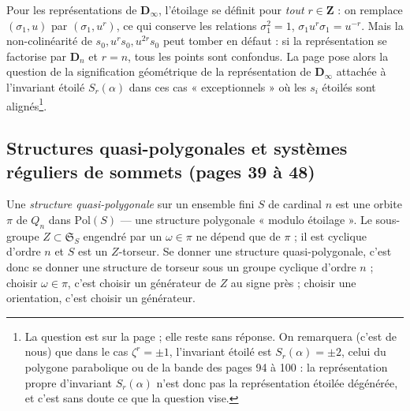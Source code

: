 \documentclass[11pt,a4paper]{article}
\begin{document}
Pour les représentations de $\mathbf{D}_\infty$, l'étoilage se définit pour
\emph{tout} $r \in \mathbf{Z}$ : on remplace $(\sigma_1, u)$ par $(\sigma_1,
u^r)$, ce qui conserve les relations $\sigma_1^2 = 1$, $\sigma_1 u^r
\sigma_1 = u^{-r}$. Mais la non-colinéarité de $s_0, u^r s_0, u^{2r} s_0$ peut
tomber en défaut : si la représentation se factorise par $\mathbf{D}_n$ et $r
= n$, tous les points sont confondus. La page pose alors la question de la
signification géométrique de la représentation de $\mathbf{D}_\infty$
attachée à l'invariant étoilé $S_r(\alpha)$ dans ces cas « exceptionnels » où
les $s_i$ étoilés sont alignés\footnote{La question est sur la page ; elle
reste sans réponse. On remarquera (c'est de nous) que dans le cas $\zeta^r =
\pm 1$, l'invariant étoilé est $S_r(\alpha) = \pm 2$, celui du polygone
parabolique ou de la bande des pages 94 à 100 : la représentation propre
d'invariant $S_r(\alpha)$ n'est donc pas la représentation étoilée dégénérée,
et c'est sans doute ce que la question vise.}.

\subsection*{Structures quasi-polygonales et systèmes réguliers de sommets (pages 39 à 48)}

Une \emph{structure quasi-polygonale} sur un ensemble fini $S$ de cardinal $n$
est une orbite $\pi$ de $Q_n$ dans $\mathrm{Pol}(S)$ --- une structure
polygonale « modulo étoilage ». Le sous-groupe $Z \subset \mathfrak{S}_S$
engendré par un $\omega \in \pi$ ne dépend que de $\pi$ ; il est cyclique
d'ordre $n$ et $S$ est un $Z$-torseur. Se donner une structure
quasi-polygonale, c'est donc se donner une structure de torseur sous un groupe
cyclique d'ordre $n$ ; choisir $\omega \in \pi$, c'est choisir un générateur
de $Z$ au signe près ; choisir une orientation, c'est choisir un générateur.
\end{document}
